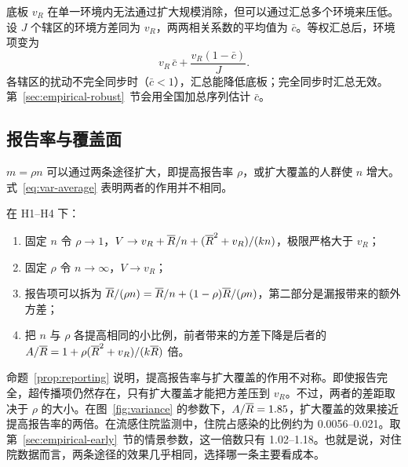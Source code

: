底板 $v_R$ 在单一环境内无法通过扩大规模消除，但可以通过汇总多个环境来压低。设 $J$ 个辖区的环境方差同为 $v_R$，两两相关系数的平均值为 $\bar c$。等权汇总后，环境项变为
\begin{equation}
  v_R\,\bar c+\frac{v_R(1-\bar c)}{J}.
  \label{eq:pooling}
\end{equation}
各辖区的扰动不完全同步时（$\bar c<1$），汇总能降低底板；完全同步时汇总无效。第~\ref{sec:empirical-robust}~节会用全国加总序列估计 $\bar c$。

\subsection{报告率与覆盖面}
\label{sec:variance-reporting}

$m=\rho n$ 可以通过两条途径扩大，即提高报告率 $\rho$，或扩大覆盖的人群使 $n$ 增大。式~\eqref{eq:var-average} 表明两者的作用并不相同。

\begin{proposition}[报告率与覆盖面的不对称]
\label{prop:reporting}
在 H1--H4 下：
\begin{enumerate}[label=(\roman*)]
  \item 固定 $n$ 令 $\rho\to1$，$V\to v_R+\overline{R}/n+(\overline{R}^2+v_R)/(kn)$，极限严格大于 $v_R$；
  \item 固定 $\rho$ 令 $n\to\infty$，$V\to v_R$；
  \item 报告项可以拆为 $\overline{R}/(\rho n)=\overline{R}/n+(1-\rho)\overline{R}/(\rho n)$，第二部分是漏报带来的额外方差；
  \item 把 $n$ 与 $\rho$ 各提高相同的小比例，前者带来的方差下降是后者的 $A/\overline{R}=1+\rho(\overline{R}^2+v_R)/(k\overline{R})$ 倍。
\end{enumerate}
\end{proposition}

命题~\ref{prop:reporting} 说明，提高报告率与扩大覆盖的作用不对称。即使报告完全，超传播项仍然存在，只有扩大覆盖才能把方差压到 $v_R$。不过，两者的差距取决于 $\rho$ 的大小。在图~\ref{fig:variance} 的参数下，$A/\overline{R}=1.85$，扩大覆盖的效果接近提高报告率的两倍。在流感住院监测中，住院占感染的比例约为 0.0056--0.021\citep{zhou2012hospitalizations, tokars2018seasonal}。取第~\ref{sec:empirical-early}~节的情景参数，这一倍数只有 1.02--1.18。也就是说，对住院数据而言，两条途径的效果几乎相同，选择哪一条主要看成本。
